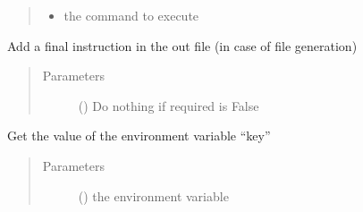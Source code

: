 \documentclass[a4paper,10pt,english]{sphinxmanual}
\begin{document}
\begin{fulllineitems}
\begin{fulllineitems}
\begin{quote}
\begin{description}
\begin{itemize}
\item {} 
 \textendash{} the command to execute

\end{itemize}

\end{description}\end{quote}

\end{fulllineitems}


\begin{fulllineitems}
\label{\detokenize{commands/apidoc/src:src.fileEnviron.FileEnviron.finish}}
Add a final instruction in the out file (in case of file generation)
\begin{quote}\begin{description}
\item[{Parameters}] \leavevmode
{} () \textendash{} Do nothing if required is False

\end{description}\end{quote}

\end{fulllineitems}


\begin{fulllineitems}
\label{\detokenize{commands/apidoc/src:src.fileEnviron.FileEnviron.get}}
Get the value of the environment variable “key”
\begin{quote}\begin{description}
\item[{Parameters}] \leavevmode
{} () \textendash{} the environment variable

\end{description}\end{quote}

\end{fulllineitems}



\end{fulllineitems}
\end{document}
